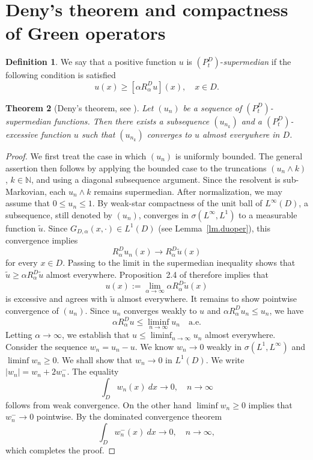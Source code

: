 \documentclass[11pt,a4paper,reqno]{amsart}
\newtheorem{theorem}{\bf Theorem}[section]
\theoremstyle{definition}
\newtheorem{definition}[theorem]{Definition}
\numberwithin{equation}{section}
\begin{document}
\section{Deny's theorem and compactness of Green operators}
\label{sec4}
\begin{definition}
We say that a positive  function $u$ is $(P^D_t)$-{\em supermedian}  if the following condition is satisfied
\[
u(x) \geq \left[\alpha R^D_{\alpha}u\right](x),\quad x\in D.
\]
\end{definition}
\begin{theorem}[Deny's theorem, see \cite{deny}]
\label{th-denys}
Let $(u_n)$ be a sequence of  $(P^D_t)$-supermedian functions.
Then there exists a subsequence $(u_{n_k})$ and a $(P^D_t)$-excessive function $u$ such that 
$(u_{n_k})$ converges to $u$ almost everywhere in $D$.
\end{theorem}
\begin{proof}
We first treat the case in which \((u_n)\) is uniformly bounded. 
The general assertion then follows by applying the bounded case to the truncations \((u_n\wedge k)\), \(k\in\mathbb N\), 
and using a diagonal subsequence argument. Since the resolvent is sub-Markovian, each \(u_n\wedge k\) remains supermedian. 
After normalization, we may assume that \(0\leq u_n\leq1\). By weak-star compactness of the unit ball of \(L^\infty(D)\), 
a subsequence, still denoted by \((u_n)\), converges in \(\sigma(L^\infty,L^1)\) to a measurable function \(\widetilde u\). 
Since \(G_{D,\alpha}(x,\cdot)\in L^1(D)\) (see Lemma~\ref{lm.duoper}), this convergence implies 
\[
R_\alpha^D u_n(x)\longrightarrow R_\alpha^D\widetilde u(x)
\]
for every \(x\in D\). Passing to the limit in the supermedian inequality shows that \(\widetilde u\geq\alpha R_\alpha^D\widetilde u\) 
almost everywhere. Proposition~2.4 of \cite{BCR} therefore implies that 
\[
u(x):=\lim_{\alpha\to\infty}\alpha R_\alpha^D\widetilde u(x)
\]
is excessive and agrees with \(\widetilde u\) almost everywhere.
It remains to show pointwise convergence of $(u_n)$.
Since $u_n$ converges weakly to $u$ and $\alpha R^D_{\alpha} u_n \le u_n$, we have
$$
\alpha R^D_{\alpha} u \le \liminf_{n\to\infty} u_n \quad \text{a.e.}
$$
Letting $\alpha \to \infty$, we establish that $u \le \liminf_{n\to\infty} u_n$ almost everywhere. 
Consider the sequence $w_n = u_n - u$. We know $w_n \to 0$ weakly in $\sigma(L^1, L^\infty)$ and $\liminf w_n \ge 0$.
We shall show that $w_n\to 0$ in $L^1(D)$. We write $|w_n|=w_n+2w_n^-$. The equality
\[
\int_D w_n(x)\ dx \to 0,\quad n\to\infty
\]
follows from weak convergence. On the other hand $\liminf w_n \ge 0$ implies that $w_n^-\to 0$ pointwise. 
By the dominated  convergence theorem 
\[
\int_D w^-_n(x)\ dx \to 0,\quad n\to\infty,
\]
which completes the proof.
\end{proof}
\end{document}
